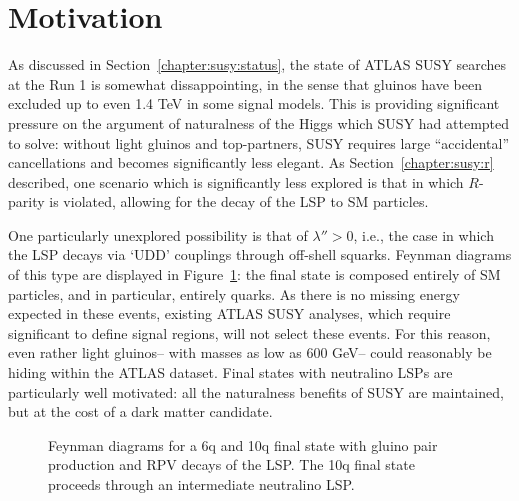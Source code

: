 \label{chapter:search}
\section{Motivation}

As discussed in Section~\ref{chapter:susy:status}, the state of ATLAS SUSY searches at the Run 1 is somewhat dissappointing, in the sense that gluinos have been excluded up to even 1.4 TeV in some signal models. This is providing significant pressure on the argument of naturalness of the Higgs which SUSY had attempted to solve: without light gluinos and top-partners, SUSY requires large ``accidental'' cancellations and becomes significantly less elegant. As Section~\ref{chapter:susy:r} described, one scenario which is significantly less explored is that in which $R$-parity is violated, allowing for the decay of the LSP to SM particles. 

One particularly unexplored possibility is that of $\lambda'' > 0$, i.e., the case in which the LSP decays via `UDD' couplings through off-shell squarks. Feynman diagrams of this type are displayed in Figure~\ref{fig:search:motivation:diagrams}: the final state is composed entirely of SM particles, and in particular, entirely quarks. As there is no missing energy expected in these events, existing ATLAS SUSY analyses, which require significant \met to define signal regions, will not select these events. For this reason, even rather light gluinos-- with masses as low as 600 GeV-- could reasonably be hiding within the ATLAS dataset. Final states with neutralino LSPs are particularly well motivated: all the naturalness benefits of SUSY are maintained, but at the cost of a dark matter candidate. 


\begin{figure}
\centering
{}
\label{fig:search:motivation:diagrams}
\caption{Feynman diagrams for a 6q and 10q final state with gluino pair production and RPV decays of the LSP. The 10q final state proceeds through an intermediate neutralino LSP.}
\end{figure}


